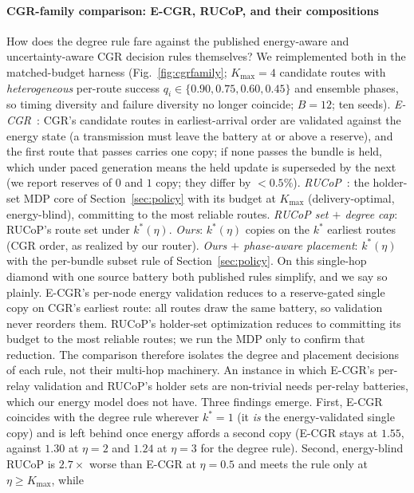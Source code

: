 \documentclass[twocolumn,3p,times,procedia]{elsarticle}
\theoremstyle{plain}
\theoremstyle{remark}
\begin{document}
\paragraph*{CGR-family comparison: E-CGR, RUCoP, and their compositions}
How does the degree rule fare against the published energy-aware and
uncertainty-aware CGR decision rules themselves? We reimplemented both
in the matched-budget harness (Fig.~\ref{fig:cgrfamily}; $K_{\max}{=}4$
candidate routes with \emph{heterogeneous} per-route success
$q_i\in\{0.90,0.75,0.60,0.45\}$ and ensemble phases, so timing diversity
and failure diversity no longer coincide; $B{=}12$; ten seeds).
\emph{E-CGR}~\cite{ecgr}: CGR's candidate routes in earliest-arrival
order are validated against the energy state (a transmission must
leave the battery at or above a reserve), and the first route that
passes carries one copy; if none passes the bundle is held, which under
paced generation means the held update is superseded by the next (we
report reserves of $0$ and $1$ copy; they differ by $<0.5\%$).
\emph{RUCoP}~\cite{rucop}: the holder-set MDP core of
Section~\ref{sec:policy} with its budget at $K_{\max}$
(delivery-optimal, energy-blind), committing to the most reliable
routes. \emph{RUCoP set $+$ degree cap}: RUCoP's route set under
$k^{\ast}(\eta)$. \emph{Ours}: $k^{\ast}(\eta)$ copies on the $k^{\ast}$
earliest routes (CGR order, as realized by our router). \emph{Ours $+$
phase-aware placement}: $k^{\ast}(\eta)$ with the per-bundle subset rule
of Section~\ref{sec:policy}. On this single-hop diamond with one source
battery both published rules simplify, and we say so plainly. E-CGR's
per-node energy validation reduces to a reserve-gated single copy on
CGR's earliest route: all routes draw the same battery, so validation
never reorders them. RUCoP's holder-set optimization reduces to
committing its budget to the most reliable routes; we run the MDP only
to confirm that reduction. The comparison therefore isolates the degree
and placement decisions of each rule, not their multi-hop machinery. An
instance in which E-CGR's per-relay validation and RUCoP's holder sets
are non-trivial needs per-relay batteries, which our energy model does
not have. Three findings emerge. First, E-CGR coincides
with the degree rule wherever $k^{\ast}{=}1$ (it \emph{is} the
energy-validated single copy) and is left behind once energy affords a
second copy (E-CGR stays at $1.55$, against $1.30$ at $\eta{=}2$ and
$1.24$ at $\eta{=}3$ for the degree rule). Second, energy-blind RUCoP is $2.7\times$ worse than E-CGR
at $\eta{=}0.5$ and meets the rule only at $\eta\ge K_{\max}$, while
\end{document}
